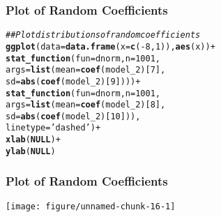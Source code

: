 \documentclass{beamer}\usepackage[]{graphicx}\usepackage[]{color}
\makeatletter
\def\maxwidth{ %
  \ifdim\Gin@nat@width>\linewidth
    \linewidth
  \else
    \Gin@nat@width
  \fi
}
\newcommand{\hlnum}[1]{\textcolor[rgb]{0.686,0.059,0.569}{#1}}%
\newcommand{\hlstr}[1]{\textcolor[rgb]{0.192,0.494,0.8}{#1}}%
\newcommand{\hlcom}[1]{\textcolor[rgb]{0.678,0.584,0.686}{\textit{#1}}}%
\newcommand{\hlopt}[1]{\textcolor[rgb]{0,0,0}{#1}}%
\newcommand{\hlstd}[1]{\textcolor[rgb]{0.345,0.345,0.345}{#1}}%
\newcommand{\hlkwa}[1]{\textcolor[rgb]{0.161,0.373,0.58}{\textbf{#1}}}%
\newcommand{\hlkwc}[1]{\textcolor[rgb]{0.333,0.667,0.333}{#1}}%
\newcommand{\hlkwd}[1]{\textcolor[rgb]{0.737,0.353,0.396}{\textbf{#1}}}%
\newenvironment{kframe}{%
 \def\at@end@of@kframe{}%
 \ifinner\ifhmode%
  \def\at@end@of@kframe{\end{minipage}}%
  \begin{minipage}{\columnwidth}%
 \fi\fi%
 \def\FrameCommand##1{\hskip\@totalleftmargin \hskip-\fboxsep
 \colorbox{shadecolor}{##1}\hskip-\fboxsep
     \hskip-\linewidth \hskip-\@totalleftmargin \hskip\columnwidth}%
 \MakeFramed {\advance\hsize-\width
   \@totalleftmargin\z@ \linewidth\hsize
   \@setminipage}}%
 {\par\unskip\endMakeFramed%
 \at@end@of@kframe}
\newenvironment{knitrout}{}{} %
\makeatother
\begin{document}
\begin{frame}[fragile]\frametitle{Plot of Random Coefficients}
\begin{knitrout}\footnotesize
{}\color{fgcolor}\begin{kframe}
\begin{alltt}
\hlcom{## Plot distributions of random coefficients}
\hlkwd{ggplot}\hlstd{(}\hlkwc{data} \hlstd{=} \hlkwd{data.frame}\hlstd{(}\hlkwc{x} \hlstd{=} \hlkwd{c}\hlstd{(}\hlopt{-}\hlnum{8}\hlstd{,} \hlnum{1}\hlstd{)),} \hlkwd{aes}\hlstd{(x))} \hlopt{+}
  \hlkwd{stat_function}\hlstd{(}\hlkwc{fun} \hlstd{= dnorm,} \hlkwc{n} \hlstd{=} \hlnum{1001}\hlstd{,}
                \hlkwc{args} \hlstd{=} \hlkwd{list}\hlstd{(}\hlkwc{mean} \hlstd{=} \hlkwd{coef}\hlstd{(model_2)[}\hlnum{7}\hlstd{],}
                            \hlkwc{sd} \hlstd{=} \hlkwd{abs}\hlstd{(}\hlkwd{coef}\hlstd{(model_2)[}\hlnum{9}\hlstd{])))} \hlopt{+}
  \hlkwd{stat_function}\hlstd{(}\hlkwc{fun} \hlstd{= dnorm,} \hlkwc{n} \hlstd{=} \hlnum{1001}\hlstd{,}
                \hlkwc{args} \hlstd{=} \hlkwd{list}\hlstd{(}\hlkwc{mean} \hlstd{=}\hlkwd{coef}\hlstd{(model_2)[}\hlnum{8}\hlstd{],}
                            \hlkwc{sd} \hlstd{=} \hlkwd{abs}\hlstd{(}\hlkwd{coef}\hlstd{(model_2)[}\hlnum{10}\hlstd{])),}
                \hlkwc{linetype} \hlstd{=} \hlstr{'dashed'}\hlstd{)} \hlopt{+}
  \hlkwd{xlab}\hlstd{(}\hlkwa{NULL}\hlstd{)} \hlopt{+}
  \hlkwd{ylab}\hlstd{(}\hlkwa{NULL}\hlstd{)}
\end{alltt}
\end{kframe}
\end{knitrout}
\end{frame}

\begin{frame}[fragile]\frametitle{Plot of Random Coefficients}
\begin{knitrout}\footnotesize
{}\color{fgcolor}

{\centering \texttt{[image: figure/unnamed-chunk-16-1]} 

}



\end{knitrout}
\end{frame}
\end{document}
